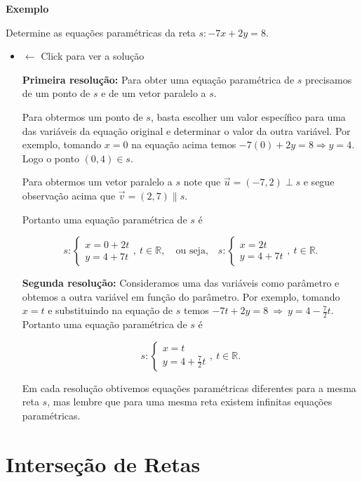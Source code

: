 \documentclass[
  brazilian,
  letterpaper,
  DIV=11,
  numbers=noendperiod]{scrreprt}
\theoremstyle{definition}
\theoremstyle{plain}
\theoremstyle{definition}
\theoremstyle{remark}
\begin{document}
\textbf{Exemplo}

Determine as equações paramétricas da reta \(s \colon -7x + 2y = 8\).

\begin{itemize}
\item
  \(\leftarrow\) Click para ver a solução

  \textbf{Primeira resolução:} Para obter uma equação paramétrica de
  \(s\) precisamos de um ponto de \(s\) e de um vetor paralelo a \(s\).

  Para obtermos um ponto de \(s\), basta escolher um valor específico
  para uma das variáveis da equação original e determinar o valor da
  outra variável. Por exemplo, tomando \(x=0\) na equação acima temos
  \(-7(0) + 2y=8 \Rightarrow y=4\). Logo o ponto \((0,4) \in s\).

  Para obtermos um vetor paralelo a \(s\) note que
  \(\vec{u}=(-7,2) \perp s\) e segue observação acima que
  \(\vec{v}=(2,7)\parallel s\).

  Portanto uma equação paramétrica de \(s\) é

  \[
    s \colon \left\lbrace \begin{array}{l} x= 0 + 2t \\ y=4+7t  \end{array} \right. , \ t \in \mathbb{R},  \quad \text{ou seja,} \quad  s \colon \left\lbrace \begin{array}{l} x= 2t\\ y=4+7t  \end{array} \right., \ t \in \mathbb{R}.
    \]

  \textbf{Segunda resolução:} Consideramos uma das variáveis como
  parâmetro e obtemos a outra variável em função do parâmetro. Por
  exemplo, tomando \(x=t\) e substituindo na equação de \(s\) temos
  \(-7t + 2y=8\ \Rightarrow \ y=4 -\frac{7}{2}t\). Portanto uma equação
  paramétrica de \(s\) é

  \[
    s \colon \left\lbrace \begin{array}{l} x= t\\ y=4+\frac{7}{2}t  \end{array} \right., \ t \in \mathbb{R}.
    \]

  Em cada resolução obtivemos equações paramétricas diferentes para a
  mesma reta \(s\), mas lembre que para uma mesma reta existem infinitas
  equações paramétricas.
\end{itemize}


\chapter{Interseção de Retas}\label{interseuxe7uxe3o-de-retas}
\end{document}

